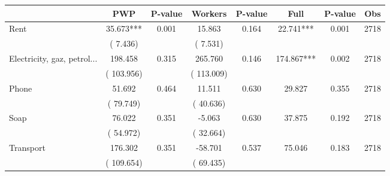 
\begin{tabular}{l*{7}{c}}\hline&\multicolumn{1}{c}{PWP}&\multicolumn{1}{c}{P-value}&\multicolumn{1}{c}{Workers}&\multicolumn{1}{c}{P-value}&\multicolumn{1}{c}{Full}&\multicolumn{1}{c}{P-value}&\multicolumn{1}{c}{Obs} \\ \hline

 Rent       &             35.673***       &        0.001  &             15.863       &        0.164  &             22.741***       &              0.001 &  2718 \\ 
                       &       (       7.436)             &                               &       (       7.531)                     &                               &                                               &                                &                      \\ 

 Electricity, gaz, petrol...       &            198.458       &        0.315  &            265.760       &        0.146  &            174.867***       &              0.002 &  2718 \\ 
                       &       (     103.956)             &                               &       (     113.009)                     &                               &                                               &                                &                      \\ 

 Phone       &             51.692       &        0.464  &             11.511       &        0.630  &             29.827       &              0.355 &  2718 \\ 
                       &       (      79.749)             &                               &       (      40.636)                     &                               &                                               &                                &                      \\ 

 Soap       &             76.022       &        0.351  &             -5.063       &        0.630  &             37.875       &              0.192 &  2718 \\ 
                       &       (      54.972)             &                               &       (      32.664)                     &                               &                                               &                                &                      \\ 

 Transport       &            176.302       &        0.351  &            -58.701       &        0.537  &             75.046       &              0.183 &  2718 \\ 
                       &       (     109.654)             &                               &       (      69.435)                     &                               &                                               &                                &                      \\ 


\end{tabular}
